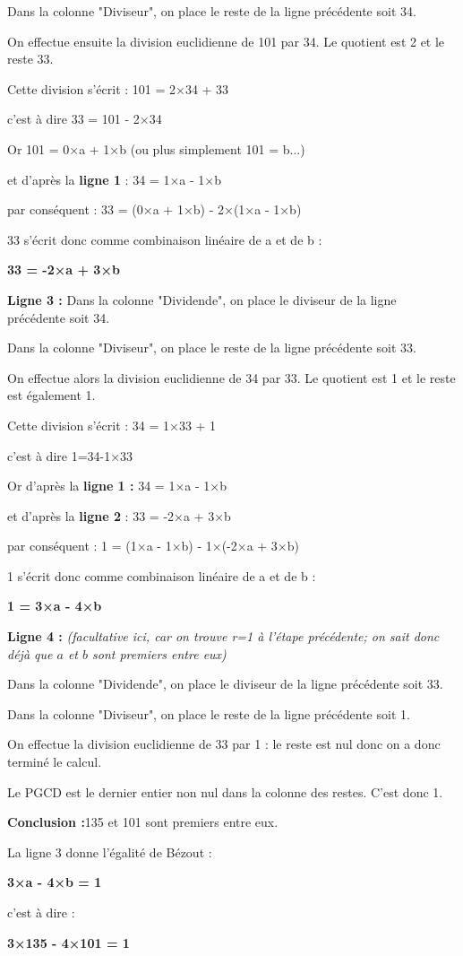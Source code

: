 \par
Dans la colonne "Diviseur", on place le reste de la ligne précédente soit 34.
\par
On effectue ensuite la division euclidienne de 101 par 34. Le quotient est 2 et le reste 33.
\par
Cette division s'écrit : 101 = 2×34 + 33
\par
c'est à dire 33 = 101 - 2×34
\par
Or 101 = 0×a + 1×b (ou plus simplement 101 = b...)
\par
et d'après la\textbf{ ligne 1} : 34 = 1×a - 1×b
\par
par conséquent : 33 = (0×a + 1×b) - 2×(1×a - 1×b)
\par
33 s'écrit donc  comme combinaison linéaire de a et de b :
\begin{center}\textbf{33 = -2×a + 3×b}\end{center}
\par
\textbf{Ligne 3 :} Dans la colonne "Dividende", on place le diviseur de la ligne précédente soit 34.
\par
Dans la colonne "Diviseur", on place le reste de la ligne précédente soit 33.
\par
On effectue alors la division euclidienne de 34 par 33. Le quotient est 1 et le reste est également 1.
\par
Cette division s'écrit : 34 = 1×33 + 1
\par
c'est à dire 1=34-1×33
\par
Or d'après la \textbf{ligne 1 :} 34 = 1×a - 1×b
\par
et d'après la \textbf{ligne 2} : 33 = -2×a + 3×b
\par
par conséquent : 1 = (1×a - 1×b) - 1×(-2×a + 3×b)
\par
1 s'écrit donc  comme combinaison linéaire de a et de b :
\begin{center}\textbf{1 = 3×a - 4×b}\end{center}
\par
\textbf{Ligne 4 : }\textit{(facultative ici, car on trouve r=1 à l'étape précédente; on sait donc déjà que $a$ et $b$ sont premiers entre eux)}
\par
Dans la colonne "Dividende", on place le diviseur de la ligne précédente soit 33.
\par
Dans la colonne "Diviseur", on place le reste de la ligne précédente soit 1.
\par
On effectue la division euclidienne de 33 par 1 : le reste est nul donc on a donc terminé le calcul.
\par
Le PGCD est le dernier entier non nul dans la colonne des restes. C'est donc 1.
\par
\textbf{Conclusion :}135 et 101 sont premiers entre eux.
\par
La ligne 3 donne l'égalité de Bézout :
\begin{center}\textbf{3×a - 4×b = 1}\end{center}
c'est à dire :
\begin{center}\textbf{3×135 - 4×101 = 1}\end{center}
